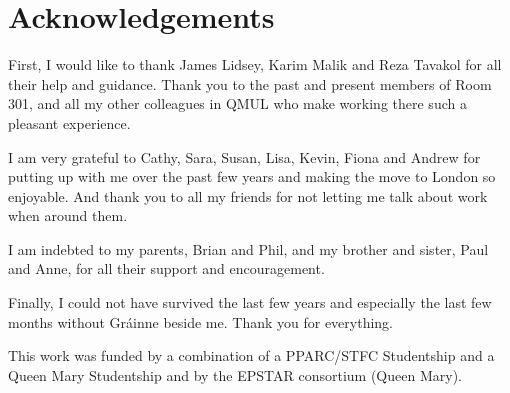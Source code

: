 \renewcommand{\CVSrevision}{\version$Id: acknowledgements.tex,v 1.8 2009/12/07 15:38:13 ith Exp $}
% 
% 
\chapter*{Acknowledgements}
\label{ch:acknowledgements}

First, I would like to thank James Lidsey, Karim Malik and Reza Tavakol for all their help and
guidance. Thank you to the past and present members of Room 301, and all my other colleagues in
QMUL who make working there such a pleasant experience.

I am very grateful to Cathy, Sara, Susan, Lisa, Kevin, Fiona and Andrew for putting up with me over
the past few years and making the move to London so enjoyable. And thank you to all my friends for
not letting me talk about work when around them.

I am indebted to my parents, Brian and Phil, and my brother and sister, Paul and Anne, for all
their support and encouragement. 

Finally, I could not have survived the last few years and especially the last few months without 
Gr\'{a}inne beside me. Thank you for everything.

\vfill

This work was funded by a combination of a PPARC/STFC Studentship and a Queen Mary Studentship and
by the EPSTAR consortium (Queen Mary).  


